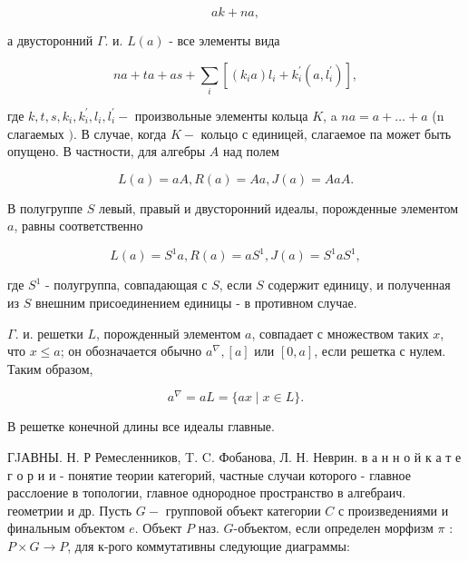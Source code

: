\documentclass[10pt]{article}
\begin{document}
\[

a k+n a,

\]



а двусторонний $\Gamma$. и. $L(a)$ - все элементы вида



\[

n a+t a+a s+\sum_{i}\left[\left(k_{i} a\right) l_{i}+k_{i}^{\prime}\left(a, l_{i}^{\prime}\right)\right],

\]



где $k, t, s, k_{i}, k_{i}^{\prime}, l_{i}, l_{i}^{\prime}-$ произвольные элементы кольца $K$, a $n a=a+\ldots+a$ (n слагаемых $)$. В случае, когда $K-$ кольцо с единицей, слагаемое па может быть опущено. В частности, для алгебры $A$ над полем



\[

L(a)=a A, R(a)=A a, J(a)=A a A .

\]



В полугруппе $S$ левый, правый и двусторонний идеалы, порожденные элементом $a$, равны соответственно



\[

L(a)=S^{1} a, R(a)=a S^{1}, J(a)=S^{1} a S^{1},

\]



где $S^{1}$ - полугруппа, совпадающая с $S$, если $S$ содержит единицу, и полученная из $S$ внешним присоединением единицы - в противном случае.



$\Gamma$. и. решетки $L$, порожденный элементом $a$, совпадает с множеством таких $x$, что $x \leqslant a$; он обозначается обычно $a^{\nabla},[a]$ или $[0, a]$, если решетка с нулем. Таким образом,



\[

a^{\nabla}=a L=\{a x \mid x \in L\} .

\]



В решетке конечной длины все идеалы главные.



ГJАВНЫ. Н. Р Ремесленников, T. C. Фобанова, Л. Н. Неврин. в а н н о й к а т е г о р и и - понятие теории категорий, частные случаи которого - главное расслоение в топологии, главное однородное пространство в алгебраич. геометрии и др. Пусть $G-$ групповой объект категории $C$ с произведениями и финальным объектом $e$. Объект $P$ наз. $G$-объектом, если определен морфизм $\pi$ : $P \times G \rightarrow P$, для к-рого коммутативны следующие диаграммы:
\end{document}
